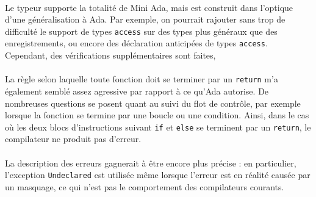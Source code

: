 \documentclass[a4paper,12pt]{article}
\begin{document}
\paragraph*{}
Le typeur supporte la totalité de Mini Ada, mais est construit dans l'optique d'une généralisation à Ada. Par exemple, on pourrait rajouter sans trop de difficulté le support de types \texttt{access} sur des types plus généraux que des enregistrements, ou encore des déclaration anticipées de types \texttt{access}. Cependant, des vérifications supplémentaires sont faites, 

\paragraph*{}
La règle selon laquelle toute fonction doit se terminer par un \texttt{return} m'a également semblé assez agressive par rapport à ce qu'Ada autorise. De nombreuses questions se posent quant au suivi du flot de contrôle, par exemple lorsque la fonction se termine par une boucle ou une condition. Ainsi, dans le cas où les deux blocs d'instructions suivant \texttt{if} et \texttt{else} se terminent par un \texttt{return}, le compilateur ne produit pas d'erreur.

\paragraph*{}
La description des erreurs gagnerait à être encore plus précise : en particulier, l'exception \texttt{Undeclared} est utilisée même lorsque l'erreur est en réalité causée par un masquage, ce qui n'est pas le comportement des compilateurs courants.
\end{document}
